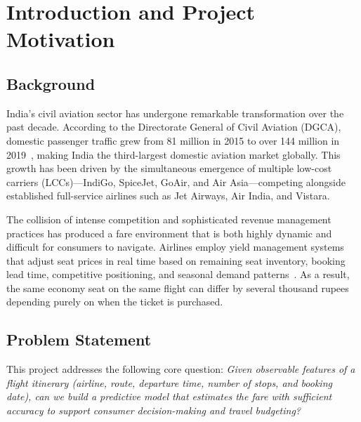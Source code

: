 \documentclass[12pt, a4paper]{article}
\begin{document}
\newpage
\tableofcontents
\newpage

\section{Introduction and Project Motivation}
\label{sec:intro}

\subsection{Background}

India's civil aviation sector has undergone remarkable transformation over the
past decade.  According to the Directorate General of Civil Aviation (DGCA),
domestic passenger traffic grew from 81 million in 2015 to over 144 million in
2019~\cite{dgca2019}, making India the third-largest domestic aviation market
globally.  This growth has been driven by the simultaneous emergence of multiple
low-cost carriers (LCCs)---IndiGo, SpiceJet, GoAir, and Air Asia---competing
alongside established full-service airlines such as Jet Airways, Air India, and
Vistara.

The collision of intense competition and sophisticated revenue management
practices has produced a fare environment that is both highly dynamic and
difficult for consumers to navigate.  Airlines employ yield management systems
that adjust seat prices in real time based on remaining seat inventory, booking
lead time, competitive positioning, and seasonal demand patterns~\cite{belobaba2009}.
As a result, the same economy seat on the same flight can differ by several
thousand rupees depending purely on when the ticket is purchased.

\subsection{Problem Statement}

This project addresses the following core question: \textit{Given observable
features of a flight itinerary (airline, route, departure time, number of stops,
and booking date), can we build a predictive model that estimates the fare with
sufficient accuracy to support consumer decision-making and travel budgeting?}
\end{document}
